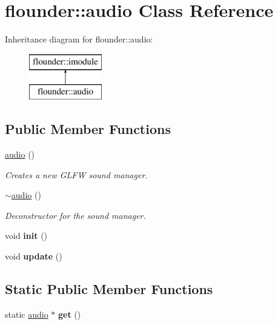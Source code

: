 \hypertarget{classflounder_1_1audio}{}\section{flounder\+:\+:audio Class Reference}
\label{classflounder_1_1audio}
Inheritance diagram for flounder\+:\+:audio\+:\begin{figure}[H]
\begin{center}
\leavevmode
\includegraphics[height=2.000000cm]{classflounder_1_1audio}
\end{center}
\end{figure}
\subsection*{Public Member Functions}
\begin{DoxyCompactItemize}
\item 
\hyperlink{classflounder_1_1audio_a0aabbb226f542847145d89adb1144c16}{audio} ()
\begin{DoxyCompactList}\small\item\em Creates a new G\+L\+FW sound manager. \end{DoxyCompactList}\item 
\hyperlink{classflounder_1_1audio_afb4d3bbb9ae399385a3abfe6e4e6d7ee}{$\sim$audio} ()
\begin{DoxyCompactList}\small\item\em Deconstructor for the sound manager. \end{DoxyCompactList}\item 
\mbox{\label{classflounder_1_1audio_aa5c529c490824dd24844192fd904a802}} 
void {\bfseries init} ()
\item 
\mbox{\label{classflounder_1_1audio_a95fffe6a580452d2118e28f4872108ed}} 
void {\bfseries update} ()
\end{DoxyCompactItemize}
\subsection*{Static Public Member Functions}
\begin{DoxyCompactItemize}
\item 
\mbox{\label{classflounder_1_1audio_ac827774b8855e8a921ef9141c2515df8}} 
static \hyperlink{classflounder_1_1audio}{audio} $\ast$ {\bfseries get} ()
\end{DoxyCompactItemize}
